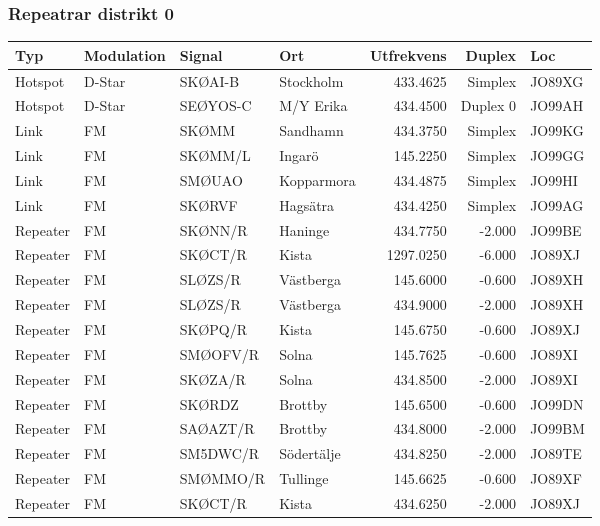 \subsubsection{Repeatrar distrikt 0}
\begin{longtable}{llllrrl}
	Typ      & Modulation & Signal   & Ort             & Utfrekvens &   Duplex & Loc    \\ \hline
	Hotspot  & D-Star     & SKØAI-B  & Stockholm       &   433.4625 &  Simplex & JO89XG \\
	Hotspot  & D-Star     & SEØYOS-C & M/Y Erika       &   434.4500 & Duplex 0 & JO99AH \\
	Link     & FM         & SKØMM    & Sandhamn        &   434.3750 &  Simplex & JO99KG \\
	Link     & FM         & SKØMM/L  & Ingarö          &   145.2250 &  Simplex & JO99GG \\
	Link     & FM         & SMØUAO   & Kopparmora      &   434.4875 &  Simplex & JO99HI \\
	Link     & FM         & SKØRVF   & Hagsätra        &   434.4250 &  Simplex & JO99AG \\
	Repeater & FM         & SKØNN/R  & Haninge         &   434.7750 &   -2.000 & JO99BE \\
	Repeater & FM         & SKØCT/R  & Kista           &  1297.0250 &   -6.000 & JO89XJ \\
	Repeater & FM         & SLØZS/R  & Västberga       &   145.6000 &   -0.600 & JO89XH \\
	Repeater & FM         & SLØZS/R  & Västberga       &   434.9000 &   -2.000 & JO89XH \\
	Repeater & FM         & SKØPQ/R  & Kista           &   145.6750 &   -0.600 & JO89XJ \\
	Repeater & FM         & SMØOFV/R & Solna           &   145.7625 &   -0.600 & JO89XI \\
	Repeater & FM         & SKØZA/R  & Solna           &   434.8500 &   -2.000 & JO89XI \\
	Repeater & FM         & SKØRDZ   & Brottby         &   145.6500 &   -0.600 & JO99DN \\
	Repeater & FM         & SAØAZT/R & Brottby         &   434.8000 &   -2.000 & JO99BM \\
	Repeater & FM         & SM5DWC/R & Södertälje      &   434.8250 &   -2.000 & JO89TE \\
	Repeater & FM         & SMØMMO/R & Tullinge        &   145.6625 &   -0.600 & JO89XF \\
	Repeater & FM         & SKØCT/R  & Kista           &   434.6250 &   -2.000 & JO89XJ \\

\end{longtable}

